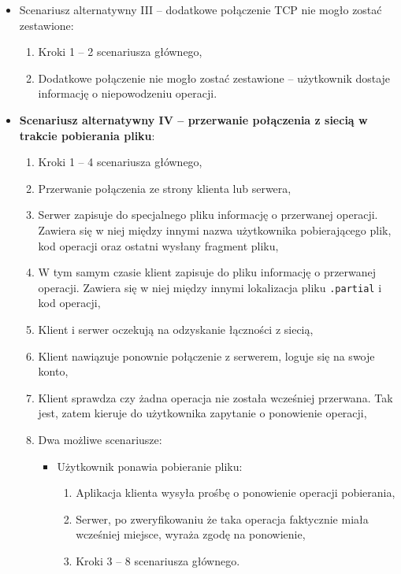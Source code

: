 \documentclass[10pt,a4paper]{article}
\begin{document}
\begin{itemize}
    \item Scenariusz alternatywny III -- dodatkowe połączenie TCP nie mogło zostać zestawione:
    \begin{enumerate}
        \item Kroki 1 -- 2 scenariusza głównego,
        \item Dodatkowe połączenie nie mogło zostać zestawione -- użytkownik dostaje informację o niepowodzeniu operacji.
    \end{enumerate}
    
    \item \textbf{Scenariusz alternatywny IV -- przerwanie połączenia z siecią w trakcie pobierania pliku}:
    \begin{enumerate}
        \item Kroki 1 -- 4 scenariusza głównego,
        \item Przerwanie połączenia ze strony klienta lub serwera,
        \item Serwer zapisuje do specjalnego pliku informację o przerwanej operacji. Zawiera się w niej między innymi nazwa użytkownika pobierającego plik, kod operacji oraz ostatni wysłany fragment pliku,
        \item W tym samym czasie klient zapisuje do pliku informację o przerwanej operacji. Zawiera się w niej między innymi lokalizacja pliku \texttt{.partial} i kod operacji,
        \item Klient i serwer oczekują na odzyskanie łączności z siecią,
        \item Klient nawiązuje ponownie połączenie z serwerem, loguje się na swoje konto,
        \item Klient sprawdza czy żadna operacja nie została wcześniej przerwana. Tak jest, zatem kieruje do użytkownika zapytanie o ponowienie operacji,
        \item Dwa możliwe scenariusze:
        \begin{itemize}
            \item Użytkownik ponawia pobieranie pliku:
            \begin{enumerate}
                \item Aplikacja klienta wysyła prośbę o ponowienie operacji pobierania,
                \item Serwer, po zweryfikowaniu że taka operacja faktycznie miała wcześniej miejsce, wyraża zgodę na ponowienie,
                \item Kroki 3 -- 8 scenariusza głównego.
            \end{enumerate}
            

\end{itemize}
\end{enumerate}
\end{itemize}
\end{document}
